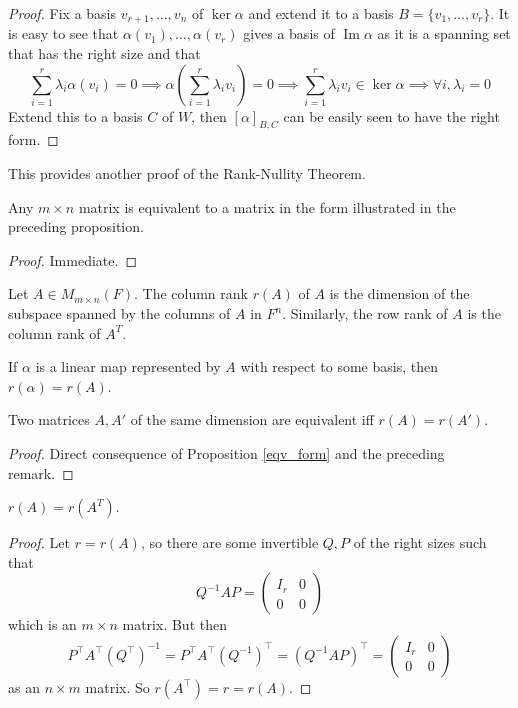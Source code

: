 \begin{proof}
    Fix a basis $v_{r+1},\ldots,v_n$ of $\ker\alpha$ and extend it to a basis $B=\{v_1,\ldots,v_r\}$.
    It is easy to see that $\alpha(v_1),\ldots,\alpha(v_r)$ gives a basis of $\operatorname{Im}\alpha$ as it is a spanning set that has the right size and that
    $$\sum_{i=1}^r\lambda_i\alpha(v_i)=0\implies \alpha\left( \sum_{i=1}^r\lambda_iv_i \right)=0\implies\sum_{i=1}^r\lambda_iv_i\in\ker\alpha\implies \forall i,\lambda_i=0$$
    Extend this to a basis $C$ of $W$, then $[\alpha]_{B,C}$ can be easily seen to have the right form.
\end{proof}
\begin{remark}
    This provides another proof of the Rank-Nullity Theorem.
\end{remark}
\begin{corollary}
    Any $m\times n$ matrix is equivalent to a matrix in the form illustrated in the preceding proposition.
\end{corollary}
\begin{proof}
    Immediate.
\end{proof}
\begin{definition}
    Let $A\in M_{m\times n}(F)$.
    The column rank $r(A)$ of $A$ is the dimension of the subspace spanned by the columns of $A$ in $F^n$.
    Similarly, the row rank of $A$ is the column rank of $A^T$.
\end{definition}
\begin{remark}
    If $\alpha$ is a linear map represented by $A$ with respect to some basis, then $r(\alpha)=r(A)$.
\end{remark}
\begin{proposition}
    Two matrices $A,A'$ of the same dimension are equivalent iff $r(A)=r(A')$.
\end{proposition}
\begin{proof}
    Direct consequence of Proposition \ref{eqv_form} and the preceding remark.
\end{proof}
\begin{theorem}
    $r(A)=r(A^T)$.
\end{theorem}
\begin{proof}
    Let $r=r(A)$, so there are some invertible $Q,P$ of the right sizes such that
    $$Q^{-1}AP=\left( \begin{array}{c|c}
        I_r&0\\
        \hline
        0&0
    \end{array} \right)$$
    which is an $m\times n$ matrix.
    But then
    $$P^\top A^\top (Q^{\top})^{-1}=P^\top A^\top(Q^{-1})^\top=(Q^{-1}AP)^\top=\left( \begin{array}{c|c}
        I_r&0\\
        \hline
        0&0
    \end{array} \right)$$
    as an $n\times m$ matrix.
    So $r(A^\top)=r=r(A)$.
\end{proof}
